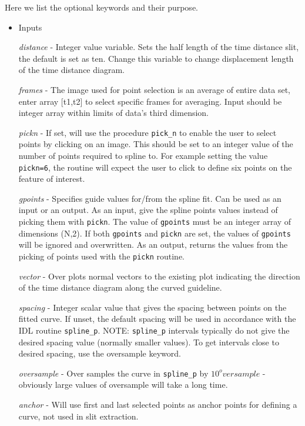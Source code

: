 \documentclass[11pt]{article}
\begin{document}
Here we list the optional keywords and their purpose.  
\begin{itemize}
\item Inputs

\textit{distance} - Integer value variable. Sets the half length of the time distance slit, the default is set as ten. Change this variable to change displacement length of the time distance diagram. 

\textit{frames} - The image used for point selection is an average of entire data set, enter array [t1,t2] to select specific frames for averaging. Input should be integer array within limits of data's third dimension.

\textit{pickn} - If set, will use the procedure \texttt{pick\_n} to enable the user to select points by clicking on an image. This should be set to an integer value of the number of points required to spline to. For example setting the value \texttt{pickn=6}, the routine will expect the user to click to define six points on the feature of interest.
                   
\textit{gpoints} - Specifies guide values for/from the spline fit. Can be used as an input or an output. As an input, give the spline points values instead of picking them with \texttt{pickn}. The value of \texttt{gpoints} must be an integer array of dimensions (N,2). If both \texttt{gpoints} and \texttt{pickn} are set, the values of \texttt{gpoints} will be ignored and overwritten. As an output, returns the values from the picking of points used with the \texttt{pickn} routine.

\textit{vector} - Over plots normal vectors to the existing plot indicating the direction of the time distance diagram along the curved guideline.

\textit{spacing} - Integer scalar value that gives the spacing between points on the fitted curve. If unset, the default spacing will be used in accordance with the IDL routine \texttt{spline\_p}. NOTE: \texttt{spline\_p} intervals typically do not give the desired spacing value (normally smaller values). To get intervals close to desired spacing, use the oversample keyword. 

\textit{oversample} - Over samples the curve in \texttt{spline\_p} by $10^oversample$ - obviously large values of oversample will take a long time.

\textit{anchor} - Will use first and last selected points as anchor points for defining a curve, not used in slit extraction. 


\end{itemize}
\end{document}
